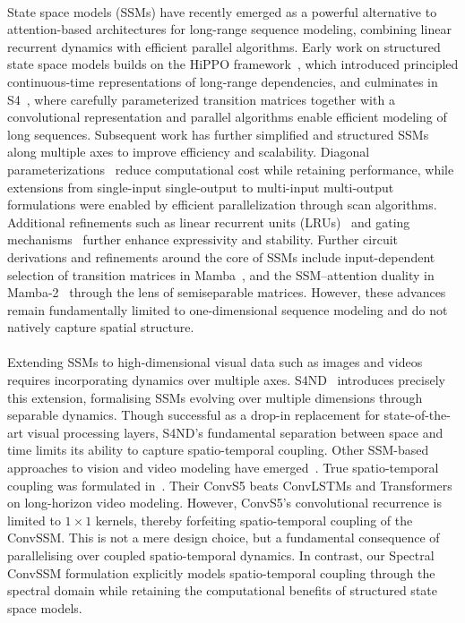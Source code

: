 \documentclass{article}
\begin{document}
\paragraph{}State space models (SSMs) have recently emerged as a powerful alternative to attention-based architectures for long-range sequence modeling, combining linear recurrent dynamics with efficient parallel algorithms. Early work on structured state space models builds on the HiPPO framework~\citep{gu2020}, which introduced principled continuous-time representations of long-range dependencies, and culminates in S4~\citep{gu2022}, where carefully parameterized transition matrices together with a convolutional representation and parallel algorithms enable efficient modeling of long sequences. Subsequent work has further simplified and structured SSMs along multiple axes to improve efficiency and scalability. Diagonal parameterizations~\citep{gu2022s4d, gupta2022} reduce computational cost while retaining performance, while extensions from single-input single-output to multi-input multi-output~\citep{smith2023s5} formulations were enabled by efficient parallelization through scan algorithms.
Additional refinements such as linear recurrent units (LRUs)~\citep{orvieto2023} and gating mechanisms~\citep{mehta2023} further enhance expressivity and stability. Further circuit derivations and refinements around the core of SSMs include input-dependent selection of transition matrices in Mamba~\citep{gu2023}, and the SSM--attention duality in Mamba-2~\citep{dao2024} through the lens of semiseparable matrices. However, these advances remain fundamentally limited to one-dimensional sequence modeling and do not natively capture spatial structure.
\paragraph{}Extending SSMs to high-dimensional visual data such as images and videos requires incorporating dynamics over multiple axes. S4ND~\citep{nguyen2022} introduces precisely this extension, formalising SSMs evolving over multiple dimensions through separable dynamics. Though successful as a drop-in replacement for state-of-the-art visual processing layers, S4ND's fundamental separation between space and time limits its ability to capture spatio-temporal coupling. Other SSM-based approaches to vision and video modeling have emerged~\citep{zhu2024,li2024videomamba,li2024mamband}.
True spatio-temporal coupling was formulated in~\citet{smith2023convs5}. Their ConvS5 beats ConvLSTMs and Transformers on long-horizon video modeling. However, ConvS5's convolutional recurrence is limited to $1 \!\times\! 1$ kernels, thereby forfeiting spatio-temporal coupling of the ConvSSM. This is not a mere design choice, but a fundamental consequence of parallelising over coupled spatio-temporal dynamics. In contrast, our Spectral ConvSSM formulation explicitly models spatio-temporal coupling through the spectral domain while retaining the computational benefits of structured state space models.
\end{document}
